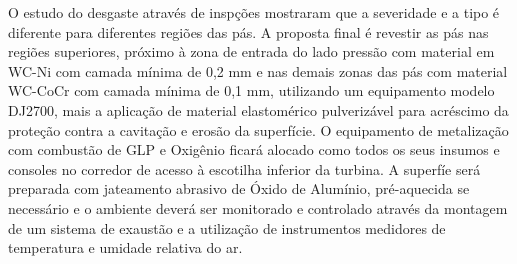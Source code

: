 O estudo do desgaste através de inspções mostraram que a severidade e a tipo é
diferente para diferentes regiões das pás. A proposta final é revestir as pás
nas regiões superiores, próximo à zona de entrada  do lado pressão com material
em WC-Ni com camada mínima de 0,2 mm e nas demais zonas das pás com material
WC-CoCr com camada mínima de 0,1 mm, utilizando um equipamento modelo DJ2700,
mais a aplicação de material elastomérico pulverizável para acréscimo da
proteção contra a cavitação e erosão da superfície. O equipamento de metalização
com combustão de GLP e Oxigênio ficará alocado como todos os seus insumos e
consoles no corredor de acesso à escotilha inferior da turbina. A superfíe será
preparada com jateamento abrasivo de Óxido de Alumínio, pré-aquecida se
necessário e o ambiente deverá ser monitorado e controlado através da montagem
de um sistema de exaustão e a utilização de instrumentos medidores de
temperatura e umidade relativa do ar.
